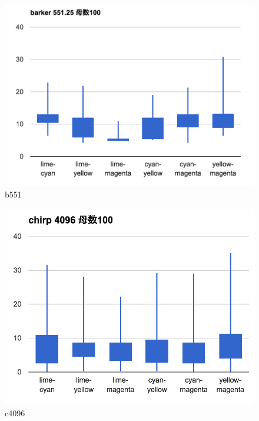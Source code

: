\begin{figure}[p]
  \centering
  \includegraphics[clip,width=1.05\hsize]{img/b551.png}
  \caption{b551}\label{fig:b551}
\end{figure}



\clearpage



\begin{figure}[p]
  \centering
  \includegraphics[clip,width=1.05\hsize]{img/c4096.png}
  \caption{c4096}\label{fig:c4096}
\end{figure}

